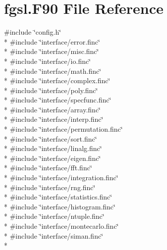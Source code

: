\hypertarget{fgsl_8F90}{\section{fgsl.\-F90 File Reference}
\label{fgsl_8F90}
}
{\ttfamily \#include \char`\"{}config.\-h\char`\"{}}\\*
{\ttfamily \#include \char`\"{}interface/error.\-finc\char`\"{}}\\*
{\ttfamily \#include \char`\"{}interface/misc.\-finc\char`\"{}}\\*
{\ttfamily \#include \char`\"{}interface/io.\-finc\char`\"{}}\\*
{\ttfamily \#include \char`\"{}interface/math.\-finc\char`\"{}}\\*
{\ttfamily \#include \char`\"{}interface/complex.\-finc\char`\"{}}\\*
{\ttfamily \#include \char`\"{}interface/poly.\-finc\char`\"{}}\\*
{\ttfamily \#include \char`\"{}interface/specfunc.\-finc\char`\"{}}\\*
{\ttfamily \#include \char`\"{}interface/array.\-finc\char`\"{}}\\*
{\ttfamily \#include \char`\"{}interface/interp.\-finc\char`\"{}}\\*
{\ttfamily \#include \char`\"{}interface/permutation.\-finc\char`\"{}}\\*
{\ttfamily \#include \char`\"{}interface/sort.\-finc\char`\"{}}\\*
{\ttfamily \#include \char`\"{}interface/linalg.\-finc\char`\"{}}\\*
{\ttfamily \#include \char`\"{}interface/eigen.\-finc\char`\"{}}\\*
{\ttfamily \#include \char`\"{}interface/fft.\-finc\char`\"{}}\\*
{\ttfamily \#include \char`\"{}interface/integration.\-finc\char`\"{}}\\*
{\ttfamily \#include \char`\"{}interface/rng.\-finc\char`\"{}}\\*
{\ttfamily \#include \char`\"{}interface/statistics.\-finc\char`\"{}}\\*
{\ttfamily \#include \char`\"{}interface/histogram.\-finc\char`\"{}}\\*
{\ttfamily \#include \char`\"{}interface/ntuple.\-finc\char`\"{}}\\*
{\ttfamily \#include \char`\"{}interface/montecarlo.\-finc\char`\"{}}\\*
{\ttfamily \#include \char`\"{}interface/siman.\-finc\char`\"{}}\\*
